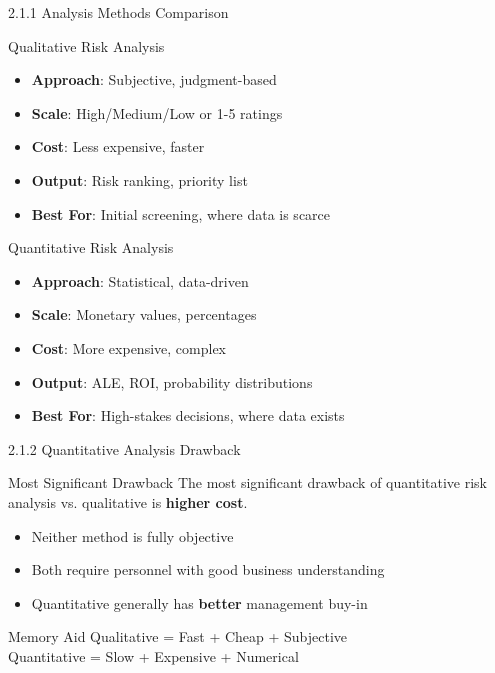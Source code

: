 \documentclass{beamer}
\begin{document}
	\begin{frame}{2.1.1 Analysis Methods Comparison}
		\begin{block}{Qualitative Risk Analysis}
			\begin{itemize}
				\item \textbf{Approach}: Subjective, judgment-based
				\item \textbf{Scale}: High/Medium/Low or 1-5 ratings
				\item \textbf{Cost}: Less expensive, faster
				\item \textbf{Output}: Risk ranking, priority list
				\item \textbf{Best For}: Initial screening, where data is scarce
			\end{itemize}
		\end{block}
		\begin{block}{Quantitative Risk Analysis}
			\begin{itemize}
				\item \textbf{Approach}: Statistical, data-driven
				\item \textbf{Scale}: Monetary values, percentages
				\item \textbf{Cost}: More expensive, complex
				\item \textbf{Output}: ALE, ROI, probability distributions
				\item \textbf{Best For}: High-stakes decisions, where data exists
			\end{itemize}
		\end{block}
	\end{frame}
	
	\begin{frame}{2.1.2 Quantitative Analysis Drawback}
		\begin{block}{Most Significant Drawback}
			The most significant drawback of quantitative risk analysis vs. qualitative is \textbf{higher cost}.
		\end{block}
		\begin{itemize}
			\item Neither method is fully objective
			\item Both require personnel with good business understanding
			\item Quantitative generally has \textbf{better} management buy-in
		\end{itemize}
		\begin{exampleblock}{Memory Aid}
			Qualitative = Fast + Cheap + Subjective \\
			Quantitative = Slow + Expensive + Numerical
		\end{exampleblock}
	\end{frame}
	
\end{document}
